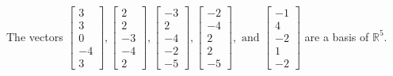 \begin{exercise}
\begin{exerciseStatement}
  \end{exerciseStatement}
  \begin{exerciseAnswer}
   The vectors \(\left[\begin{array}{r}
3 \\
3 \\
0 \\
-4 \\
3
\end{array}\right] , \left[\begin{array}{r}
2 \\
2 \\
-3 \\
-4 \\
2
\end{array}\right] , \left[\begin{array}{r}
-3 \\
2 \\
-4 \\
-2 \\
-5
\end{array}\right] , \left[\begin{array}{r}
-2 \\
-4 \\
2 \\
2 \\
-5
\end{array}\right] , \text{ and } \left[\begin{array}{r}
-1 \\
4 \\
-2 \\
1 \\
-2
\end{array}\right]\) 
  	 are  a basis of \(\mathbb{R}^5\).
  


  \end{exerciseAnswer}
\end{exercise}